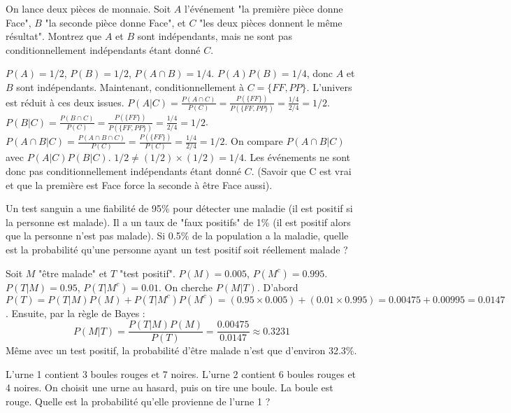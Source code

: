 \begin{exercicebox}
On lance deux pièces de monnaie. Soit $A$ l'événement "la première pièce donne Face", $B$ "la seconde pièce donne Face", et $C$ "les deux pièces donnent le même résultat". Montrez que $A$ et $B$ sont indépendants, mais ne sont pas conditionnellement indépendants étant donné $C$.
\end{exercicebox}

\begin{correctionbox}
$P(A)=1/2$, $P(B)=1/2$, $P(A \cap B)=1/4$. $P(A)P(B) = 1/4$, donc $A$ et $B$ sont indépendants.
Maintenant, conditionnellement à $C=\{FF, PP\}$. L'univers est réduit à ces deux issues.
$P(A|C) = \frac{P(A \cap C)}{P(C)} = \frac{P(\{FF\})}{P(\{FF,PP\})} = \frac{1/4}{2/4} = 1/2$.
$P(B|C) = \frac{P(B \cap C)}{P(C)} = \frac{P(\{FF\})}{P(\{FF,PP\})} = \frac{1/4}{2/4} = 1/2$.
$P(A \cap B | C) = \frac{P(A \cap B \cap C)}{P(C)} = \frac{P(\{FF\})}{P(C)} = \frac{1/4}{2/4} = 1/2$.
On compare $P(A \cap B | C)$ avec $P(A|C)P(B|C)$.
$1/2 \neq (1/2) \times (1/2) = 1/4$.
Les événements ne sont donc pas conditionnellement indépendants étant donné $C$. (Savoir que C est vrai et que la première est Face force la seconde à être Face aussi).
\end{correctionbox}

\begin{exercicebox}
Un test sanguin a une fiabilité de 95\% pour détecter une maladie (il est positif si la personne est malade). Il a un taux de "faux positifs" de 1\% (il est positif alors que la personne n'est pas malade). Si 0.5\% de la population a la maladie, quelle est la probabilité qu'une personne ayant un test positif soit réellement malade ?
\end{exercicebox}

\begin{correctionbox}
Soit $M$ "être malade" et $T$ "test positif".
$P(M)=0.005$, $P(M^c)=0.995$.
$P(T|M)=0.95$, $P(T|M^c)=0.01$.
On cherche $P(M|T)$.
D'abord $P(T) = P(T|M)P(M) + P(T|M^c)P(M^c) = (0.95 \times 0.005) + (0.01 \times 0.995) = 0.00475 + 0.00995 = 0.0147$.
Ensuite, par la règle de Bayes :
$$ P(M|T) = \frac{P(T|M)P(M)}{P(T)} = \frac{0.00475}{0.0147} \approx 0.3231 $$
Même avec un test positif, la probabilité d'être malade n'est que d'environ 32.3\%.
\end{correctionbox}

\begin{exercicebox}
L'urne 1 contient 3 boules rouges et 7 noires. L'urne 2 contient 6 boules rouges et 4 noires. On choisit une urne au hasard, puis on tire une boule. La boule est rouge. Quelle est la probabilité qu'elle provienne de l'urne 1 ?
\end{exercicebox}


